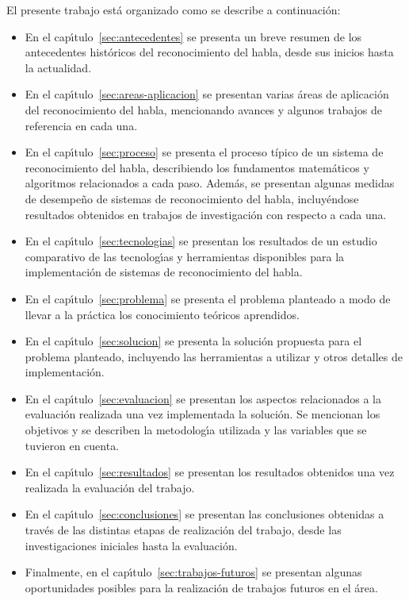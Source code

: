 El presente trabajo est\'a organizado como se describe a continuaci\'on:

\begin{itemize}
    \item En el cap{\'\i}tulo~\ref{sec:antecedentes} se presenta un breve resumen de los antecedentes hist\'oricos del reconocimiento
	del habla, desde sus inicios hasta la actualidad.
    \item En el cap{\'\i}tulo~\ref{sec:areas-aplicacion} se presentan varias \'areas de aplicaci\'on del reconocimiento del habla, 
	mencionando avances y algunos trabajos de referencia en cada una.
    \item En el cap{\'\i}tulo~\ref{sec:proceso} se presenta el proceso t\'{i}pico de un sistema de reconocimiento del habla,
	describiendo los fundamentos matem\'aticos y algoritmos relacionados a cada paso. Adem\'as, se presentan algunas 
    medidas de desempe\~no de sistemas de reconocimiento del
	habla, incluy\'endose resultados obtenidos en trabajos de investigaci\'on con respecto a cada una.
    \item En el cap{\'\i}tulo~\ref{sec:tecnologias} se presentan los resultados de un estudio comparativo de las tecnolog{\'\i}as
	y herramientas disponibles para la implementaci\'on de sistemas de reconocimiento del habla.
    \item En el cap{\'\i}tulo~\ref{sec:problema} se presenta el problema planteado a modo de llevar a la pr\'actica los
	conocimiento te\'oricos aprendidos.
    \item En el cap{\'\i}tulo~\ref{sec:solucion} se presenta la soluci\'on propuesta para el problema planteado, incluyendo
	las herramientas a utilizar y otros detalles de implementaci\'on.
    \item En el cap{\'\i}tulo~\ref{sec:evaluacion} se presentan los aspectos relacionados a la evaluaci\'on realizada una vez
	implementada la soluci\'on. Se mencionan los objetivos y se describen la metodolog{\'\i}a utilizada
	y las variables que se tuvieron en cuenta.
    \item En el cap{\'\i}tulo~\ref{sec:resultados} se presentan los resultados obtenidos una vez realizada la evaluaci\'on
	del trabajo.
    \item En el cap{\'\i}tulo~\ref{sec:conclusiones} se presentan las conclusiones obtenidas a trav\'es de las distintas
	etapas de realizaci\'on del trabajo, desde las investigaciones iniciales hasta la evaluaci\'on.
    \item Finalmente, en el cap{\'\i}tulo~\ref{sec:trabajos-futuros} se presentan algunas oportunidades
    posibles para la realizaci\'on de trabajos futuros en el \'area.
\end{itemize}